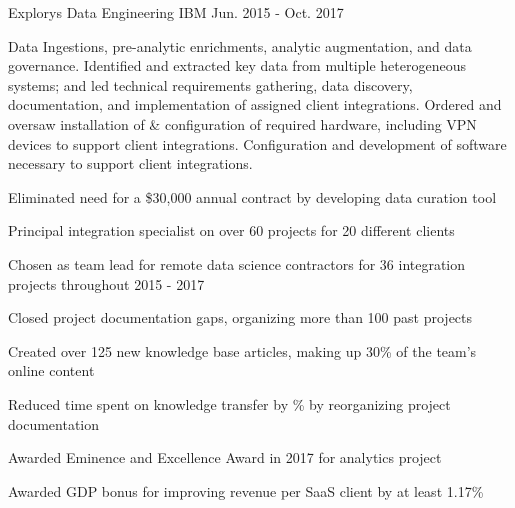 \begin{cventries}
  \cventry
    {Explorys} %
    {Data Engineering} %
    {IBM} %
    {Jun. 2015 - Oct. 2017} %
    {
      \begin{cvparagraph}
        Data Ingestions, pre-analytic enrichments, analytic augmentation, and data governance.  Identified and extracted key data from multiple heterogeneous systems; and led technical requirements gathering, data discovery, documentation, and implementation of assigned client integrations.  Ordered and oversaw installation of \& configuration of required hardware, including VPN devices to support client integrations.  Configuration and development of software necessary to support client integrations.
      \end{cvparagraph}
      \begin{cvitems} %
        \item {Eliminated need for a \$30,000 annual contract by developing data curation tool}
        \item {Principal integration specialist on over 60 projects for 20 different clients}
        \item {Chosen as team lead for  remote data science contractors for 36 integration projects throughout 2015 - 2017}
        \item {Closed project documentation gaps, organizing more than 100 past projects}
        \item {Created over 125 new knowledge base articles, making up 30\% of the team's online content}
        \item {Reduced time spent on knowledge transfer by \% by reorganizing project documentation}
        \item {Awarded Eminence and Excellence Award in 2017 for analytics project}
        \item {Awarded GDP bonus for improving revenue per SaaS client by at least 1.17\%}
      \end{cvitems}
    }


\end{cventries}
